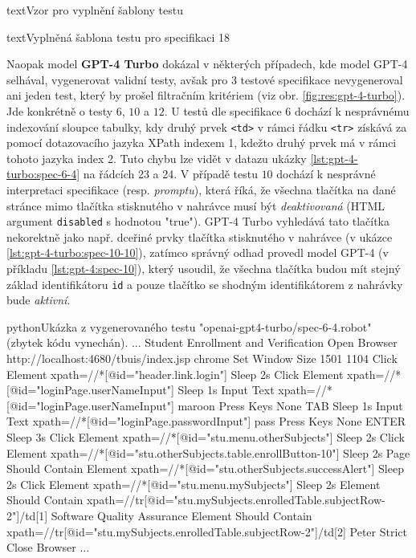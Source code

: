 \documentclass[czech, ma, kiv, he, iso690numb, pdf, viewonly]{fasthesis}
\begin{document}
\begin{code}{text}{Vzor pro vyplnění šablony testu \label{lst:template}}
{\begin{code}{text}{Vyplněná šablona testu pro specifikaci 18 \label{lst:spec18}}
{            Naopak model \textbf{GPT-4 Turbo} dokázal v některých případech, kde model GPT-4 selhával, vygenerovat validní testy, avšak pro 3 testové specifikace nevygeneroval ani jeden test, který by prošel filtračním kritériem (viz obr. \ref{fig:res:gpt-4-turbo}). Jde konkrétně o testy \(6\), \(10\) a \(12\). U testů dle specifikace \(6\) dochází k nesprávnému indexování sloupce tabulky, kdy druhý prvek \verb|<td>| v rámci řádku \verb|<tr>| získává za pomocí dotazovacího jazyka XPath indexem 1, kdežto druhý prvek má v rámci tohoto jazyka index 2. Tuto chybu lze vidět v datazu ukázky \ref{lst:gpt-4-turbo:spec-6-4} na řádcích 23 a 24. V případě testu \(10\) dochází k nesprávné interpretaci specifikace (resp. \emph{promptu}), která říká, že všechna tlačítka na dané stránce mimo tlačítka stisknutého v nahrávce musí být \textit{deaktivovaná} (HTML argument \verb|disabled| s hodnotou "true"). GPT-4 Turbo vyhledává tato tlačítka nekorektně jako např. dceřiné prvky tlačítka stisknutého v nahrávce (v ukázce \ref{lst:gpt-4-turbo:spec-10-10}), zatímco správný odhad provedl model GPT-4 (v příkladu \ref{lst:gpt-4:spec-10}), který usoudil, že všechna tlačítka budou mít stejný základ identifikátoru \verb|id| a pouze tlačítko se shodným identifikátorem z nahrávky bude \textit{aktivní}.

            \begin{code}{python}{Ukázka z vygenerovaného testu "openai-gpt4-turbo/spec-6-4.robot" (zbytek kódu vynechán). \label{lst:gpt-4-turbo:spec-6-4}}
...
Student Enrollment and Verification
    Open Browser    http://localhost:4680/tbuis/index.jsp    chrome
    Set Window Size    1501    1104
    Click Element    xpath=//*[@id="header.link.login"]
    Sleep    2s
    Click Element    xpath=//*[@id="loginPage.userNameInput"]
    Sleep    1s
    Input Text    xpath=//*[@id="loginPage.userNameInput"]    maroon
    Press Keys    None    TAB
    Sleep    1s
    Input Text    xpath=//*[@id="loginPage.passwordInput"]    pass
    Press Keys    None    ENTER
    Sleep    3s
    Click Element    xpath=//*[@id="stu.menu.otherSubjects"]
    Sleep    2s
    Click Element    xpath=//*[@id="stu.otherSubjects.table.enrollButton-10"]
    Sleep    2s
    Page Should Contain Element    xpath=//*[@id="stu.otherSubjects.successAlert"]
    Sleep    2s
    Click Element    xpath=//*[@id="stu.menu.mySubjects"]
    Sleep    2s
    Element Should Contain    xpath=//tr[@id="stu.mySubjects.enrolledTable.subjectRow-2"]/td[1]    Software Quality Assurance
    Element Should Contain    xpath=//tr[@id="stu.mySubjects.enrolledTable.subjectRow-2"]/td[2]    Peter Strict
    Close Browser
...
            \end{code}

}
\end{code}}
\end{code}
\end{document}
